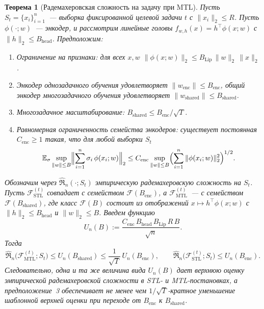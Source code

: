 \documentclass{dissert}
\newtheorem{theorem}{Теорема}
\begin{document}
\begin{theorem}[Радемахеровская сложность на задачу при MTL]
Пусть $S_t=\{x_i\}_{i=1}^n$~--- выборка фиксированной целевой задачи $t$ с $\|x_i\|_2 \le R$.
Пусть $\phi(\cdot;w)$~--- энкодер, и рассмотрим линейные головы
$f_{w,h}(x)=h^\top \phi(x;w)$ с $\|h\|_2 \le B_{\mathrm{head}}$.
Предположим:
\begin{enumerate}
\item Ограничение на признаки: для всех $x,w$
$\|\phi(x;w)\|_2 \le B_{\mathrm{Lip}}\,\|w\|_2\,\|x\|_2$.
\item Энкодер однозадачного обучения удовлетворяет $\|w_{\mathrm{enc}}\|\le B_{\mathrm{enc}}$,
общий энкодер многозадачного обучения удовлетворяет $\|w_{\mathrm{shared}}\|\le B_{\mathrm{shared}}$.
\item Многозадачное масштабирование: $B_{\mathrm{shared}} \le B_{\mathrm{enc}}/\sqrt{T}$.
\item Равномерная ограниченность семейства энкодеров: существует постоянная $C_{\mathrm{enc}}\ge1$ такая, что для любой выборки $S_t$
\[
    \mathbb{E}_{\sigma}\sup_{\|w\|\le B}
    \Bigl\|\sum_{i=1}^{n}\sigma_i\,\phi(x_i;w)\Bigr\|_2
    \le
    C_{\mathrm{enc}}\sup_{\|w\|\le B}
    \Bigl(\sum_{i=1}^{n}\|\phi(x_i;w)\|_2^2\Bigr)^{1/2}.
\]
\end{enumerate}

Обозначим через $\widehat{\mathfrak R}_n(\cdot;S_t)$ эмпирическую радемахеровскую сложность на $S_t$.
Пусть $\mathcal{F}_{\mathrm{STL}}^{(t)}$ совпадает с семейством $\mathcal{F}(B_{\mathrm{enc}})$, а $\mathcal{F}_{\mathrm{MTL}}^{(t)}$~--- с семейством $\mathcal{F}(B_{\mathrm{shared}})$, где класс $\mathcal{F}(B)$ состоит из отображений $x \mapsto h^\top \phi(x;w)$ с $\|h\|_2 \le B_{\mathrm{head}}$ и $\|w\|_2 \le B$.
Введем функцию
\begin{equation}
U_n(B) := \frac{C_{\mathrm{enc}}\,B_{\mathrm{head}}\,B_{\mathrm{Lip}}\,R\,B}{\sqrt{n}}.
\end{equation}
Тогда
\begin{equation}
\widehat{\mathfrak R}_n\!\big(\mathcal{F}_{\mathrm{MTL}}^{(t)};S_t\big)\le U_n(B_{\mathrm{shared}})\le \frac{1}{\sqrt{T}}\,U_n(B_{\mathrm{enc}}),
\qquad
\widehat{\mathfrak R}_n\!\big(\mathcal{F}_{\mathrm{STL}}^{(t)};S_t\big)\le U_n(B_{\mathrm{enc}}).
\end{equation}
Следовательно, одна и та же величина вида $U_n(B)$ дает верхнюю оценку эмпирической радемахеровской сложности в STL- и MTL-постановках, а предположение~3 обеспечивает не менее чем $1/\sqrt{T}$-кратное уменьшение шаблонной верхней оценки при переходе от $B_{\mathrm{enc}}$ к $B_{\mathrm{shared}}$.
\end{theorem}
\end{document}
